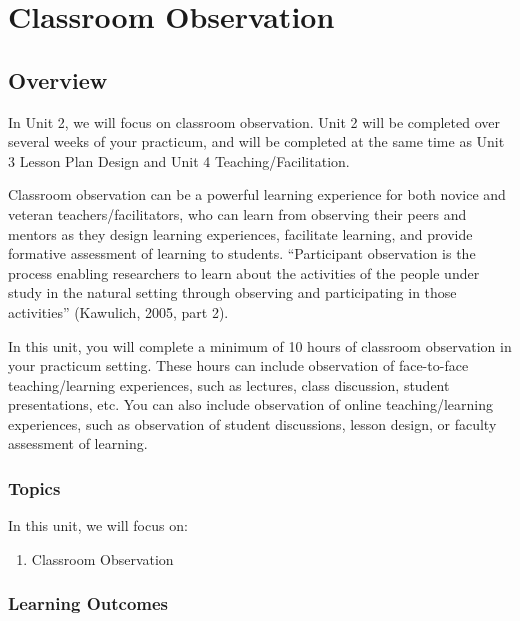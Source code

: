 \documentclass[
]{book}
\providecommand{\tightlist}{%
  \setlength{\itemsep}{0pt}\setlength{\parskip}{0pt}}
\begin{document}
\hypertarget{classroom-observation}{%
\chapter{Classroom Observation}\label{classroom-observation}}

\hypertarget{overview-2}{%
\section*{Overview}\label{overview-2}}

In Unit 2, we will focus on classroom observation. Unit 2 will be completed over several weeks of your practicum, and will be completed at the same time as Unit 3 Lesson Plan Design and Unit 4 Teaching/Facilitation.

Classroom observation can be a powerful learning experience for both novice and veteran teachers/facilitators, who can learn from observing their peers and mentors as they design learning experiences, facilitate learning, and provide formative assessment of learning to students. ``Participant observation is the process enabling researchers to learn about the activities of the people under study in the natural setting through observing and participating in those activities'' (Kawulich, 2005, part 2).

In this unit, you will complete a minimum of 10 hours of classroom observation in your practicum setting. These hours can include observation of face-to-face teaching/learning experiences, such as lectures, class discussion, student presentations, etc. You can also include observation of online teaching/learning experiences, such as observation of student discussions, lesson design, or faculty assessment of learning.

\hypertarget{topics-2}{%
\subsection*{Topics}\label{topics-2}}

In this unit, we will focus on:

\begin{enumerate}
\def\labelenumi{\arabic{enumi}.}
\tightlist
\item
  Classroom Observation
\end{enumerate}

\hypertarget{learning-outcomes-3}{%
\subsection*{Learning Outcomes}\label{learning-outcomes-3}}
\end{document}
